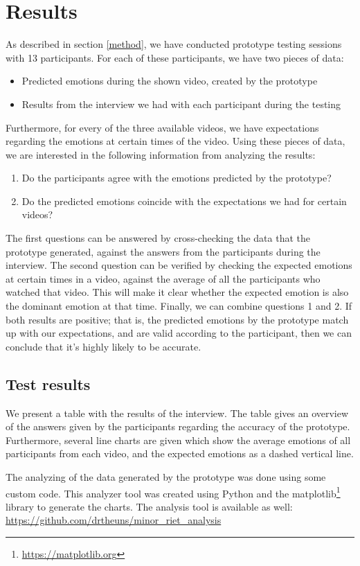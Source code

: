 \documentclass[sigconf]{acmart}
\begin{document}
\section{Results} \label{results}
As described in section \ref{method}, we have conducted prototype testing sessions with 13 participants.
For each of these participants, we have two pieces of data:
\begin{itemize}
    \item{Predicted emotions during the shown video, created by the prototype}
    \item{Results from the interview we had with each participant during the testing}
\end{itemize}
Furthermore, for every of the three available videos, we have expectations regarding the emotions at certain
times of the video. Using these pieces of data, we are interested in the following information from analyzing
the results:
\begin{enumerate}
    \item{Do the participants agree with the emotions predicted by the prototype?}
    \item{Do the predicted emotions coincide with the expectations we had for certain videos?}
\end{enumerate}
The first questions can be answered by cross-checking the data that the prototype generated, against the
answers from the participants during the interview. The second question can be verified by checking the
expected emotions at certain times in a video, against the average of all the participants who watched that
video. This will make it clear whether the expected emotion is also the dominant emotion at that time.
Finally, we can combine questions 1 and 2. If both results are positive; that is, the predicted emotions by the
prototype match up with our expectations, and are valid according to the participant, then we can conclude
that it's highly likely to be accurate.

\subsection{Test results}
We present a table with the results of the interview. The table gives an overview of the answers given by the
participants regarding the accuracy of the prototype. Furthermore, several line charts are given which show
the average emotions of all participants from each video, and the expected emotions as a dashed vertical line.

The analyzing of the data generated by the prototype was done using some custom code. This analyzer tool was
created using Python and the matplotlib\footnote{\url{https://matplotlib.org}} library to generate the charts.
The analysis tool is available as well: \url{https://github.com/drtheuns/minor_riet_analysis}
\end{document}
